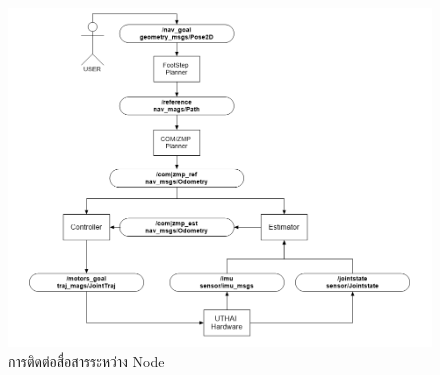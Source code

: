 \begin{figure}[!ht]
	\centering
	\includegraphics[width=\textwidth]{chapter3/images/uthai_ros_node.png}
	\caption{การติดต่อสื่อสารระหว่าง Node}
	\label{fig:uthai_ros_node}
\end{figure}

